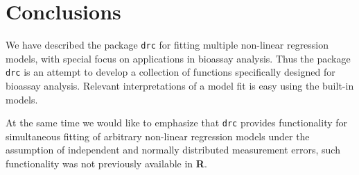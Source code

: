 \documentclass[a4paper]{article}
\begin{document}
%
%
%
%
%
%


\newpage
\section{Conclusions} \label{sec:conclusions}

We have described the package \verb+drc+ for fitting multiple non-linear regression models, with special focus on applications in bioassay analysis. 
Thus the package \verb+drc+ is an attempt to develop a collection of functions specifically designed for bioassay analysis. Relevant interpretations 
of a model fit is easy using the built-in models.

At the same time we would like to emphasize that \verb+drc+ provides functionality for simultaneous fitting of arbitrary non-linear regression models
under the assumption of independent and normally distributed measurement errors, such functionality was not previously available in \textbf{R}.




\end{document}
